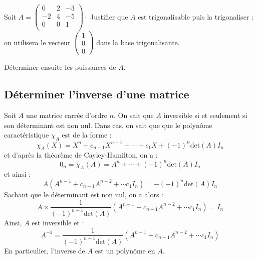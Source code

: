 \documentclass[french,11pt,twoside]{VcCours}
\begin{document}
\begin{Exemple}{} Soit $A = \begin{pmatrix}
0 & 2 & -3 \\
-2 & 4 & -5 \\
0 & 0 & 1 \\
\end{pmatrix} \cdot$
Justifier que $A$ est trigonalisable puis la trigonaliser : on utilisera le vecteur $\begin{pmatrix}
1 \\
0 \\
0 
\end{pmatrix}$ dans la base trigonalisante.


Déterminer ensuite les puissances de $A$.


\end{Exemple}
\newpage

\vspace*{12cm}

\subsection{Déterminer l'inverse d'une matrice}

Soit $A$ une matrice carrée d'ordre $n$. On sait que $A$ inversible si et seulement si son déterminant est non nul. Dans cas, on sait que   que le polynôme caractéristique $\chi_A$ est de la forme :
$$ \chi_A(X) = X^n + c_{n-1} X^{n-1}+ \cdots + c_1 X+  (-1)^n \textrm{det}(A) I_n$$
et d'après la théorème de Cayley-Hamilton, on a :
$$ 0_n = \chi_A(A) =  A^n + \cdots + (-1)^n \textrm{det}(A) I_n$$
et ainsi :
$$ A( A^{n-1} + c_{n-1} A^{n-2} + \cdots c_1 I_n) = -(-1)^n \textrm{det}(A) I_n$$
Sachant que le déterminant est non nul, on a alors :
$$ A \times \frac{1}{(-1)^{n+1} \textrm{det}(A)} ( A^{n-1} + c_{n-1} A^{n-2} + \cdots c_1 I_n) = I_n$$
Ainsi, $A$ est inversible et :
$$ A^{-1} =  \frac{1}{(-1)^{n+1} \textrm{det}(A)} ( A^{n-1} + c_{n-1} A^{n-2} + \cdots c_1 I_n)$$
En particulier, l'inverse de $A$ est un polynôme en $A$.
\end{document}
